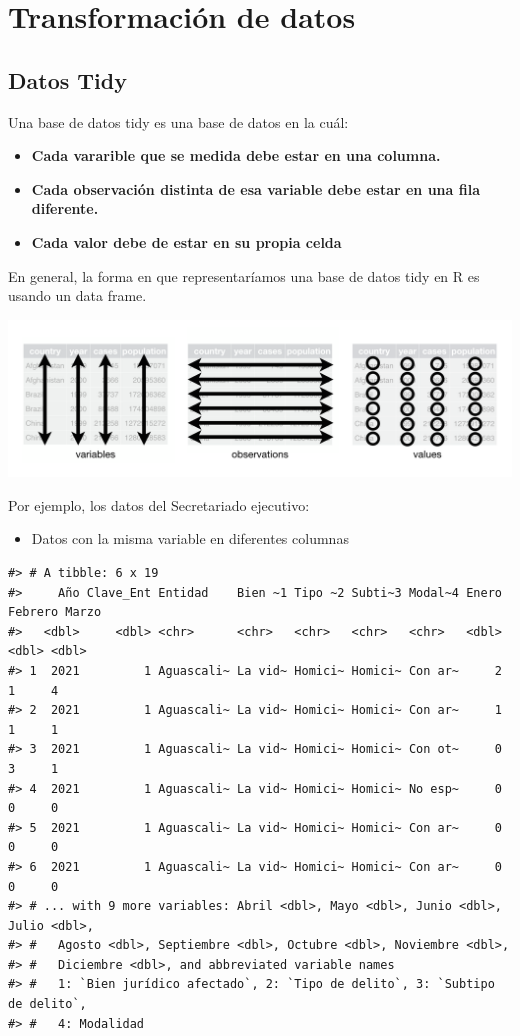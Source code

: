 \documentclass[
]{book}
\providecommand{\tightlist}{%
  \setlength{\itemsep}{0pt}\setlength{\parskip}{0pt}}
\begin{document}
\hypertarget{transformaciuxf3n-de-datos}{%
\section{Transformación de datos}\label{transformaciuxf3n-de-datos}}

\hypertarget{datos-tidy}{%
\subsection*{Datos Tidy}\label{datos-tidy}}

Una base de datos tidy es una base de datos en la cuál:

\begin{itemize}
\tightlist
\item
  \textbf{Cada vararible que se medida debe estar en una columna.}
\item
  \textbf{Cada observación distinta de esa variable debe estar en una fila diferente.}
\item
  \textbf{Cada valor debe de estar en su propia celda}
\end{itemize}

En general, la forma en que representaríamos una base de datos tidy en R es usando un data frame.

\includegraphics{imagenes/tidy.png}

Por ejemplo, los datos del Secretariado ejecutivo:

\begin{itemize}
\tightlist
\item
  Datos con la misma variable en diferentes columnas
\end{itemize}

\begin{verbatim}
#> # A tibble: 6 x 19
#>     Año Clave_Ent Entidad    Bien ~1 Tipo ~2 Subti~3 Modal~4 Enero Febrero Marzo
#>   <dbl>     <dbl> <chr>      <chr>   <chr>   <chr>   <chr>   <dbl>   <dbl> <dbl>
#> 1  2021         1 Aguascali~ La vid~ Homici~ Homici~ Con ar~     2       1     4
#> 2  2021         1 Aguascali~ La vid~ Homici~ Homici~ Con ar~     1       1     1
#> 3  2021         1 Aguascali~ La vid~ Homici~ Homici~ Con ot~     0       3     1
#> 4  2021         1 Aguascali~ La vid~ Homici~ Homici~ No esp~     0       0     0
#> 5  2021         1 Aguascali~ La vid~ Homici~ Homici~ Con ar~     0       0     0
#> 6  2021         1 Aguascali~ La vid~ Homici~ Homici~ Con ar~     0       0     0
#> # ... with 9 more variables: Abril <dbl>, Mayo <dbl>, Junio <dbl>, Julio <dbl>,
#> #   Agosto <dbl>, Septiembre <dbl>, Octubre <dbl>, Noviembre <dbl>,
#> #   Diciembre <dbl>, and abbreviated variable names
#> #   1: `Bien jurídico afectado`, 2: `Tipo de delito`, 3: `Subtipo de delito`,
#> #   4: Modalidad
\end{verbatim}
\end{document}
